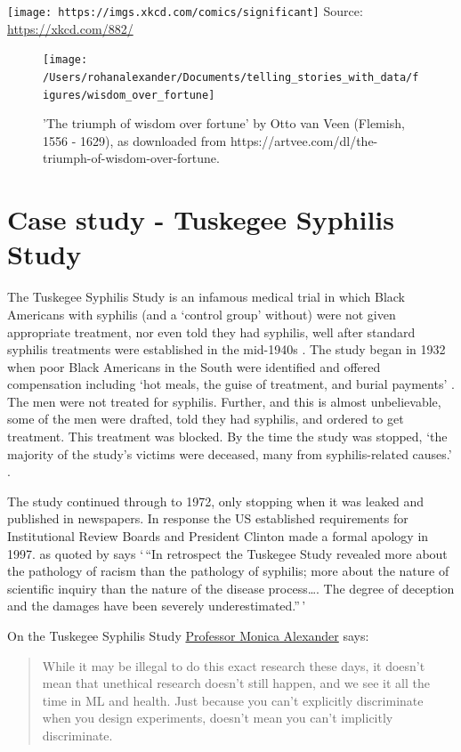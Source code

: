 \documentclass[
]{book}
\begin{document}
\texttt{[image: https://imgs.xkcd.com/comics/significant]}
Source: \url{https://xkcd.com/882/}

\begin{figure}
\texttt{[image: /Users/rohanalexander/Documents/telling\_stories\_with\_data/figures/wisdom\_over\_fortune]} \caption{'The triumph of wisdom over fortune' by Otto van Veen (Flemish, 1556 - 1629), as downloaded from https://artvee.com/dl/the-triumph-of-wisdom-over-fortune.}\label{fig:unnamed-chunk-241}
\end{figure}

\hypertarget{case-study---tuskegee-syphilis-study}{%
\section{Case study - Tuskegee Syphilis Study}\label{case-study---tuskegee-syphilis-study}}

The Tuskegee Syphilis Study is an infamous medical trial in which Black Americans with syphilis (and a `control group' without) were not given appropriate treatment, nor even told they had syphilis, well after standard syphilis treatments were established in the mid-1940s \citep{marcella}. The study began in 1932 when poor Black Americans in the South were identified and offered compensation including `hot meals, the guise of treatment, and burial payments' \citep{marcella}. The men were not treated for syphilis. Further, and this is almost unbelievable, some of the men were drafted, told they had syphilis, and ordered to get treatment. This treatment was blocked. By the time the study was stopped, `the majority of the study's victims were deceased, many from syphilis-related causes.' \citep{marcella}.

The study continued through to 1972, only stopping when it was leaked and published in newspapers. In response the US established requirements for Institutional Review Boards and President Clinton made a formal apology in 1997. \citet{brandt1978racism} as quoted by \citet{marcella} says `\,``In retrospect the Tuskegee Study revealed more about the pathology of racism than the pathology of syphilis; more about the nature of scientific inquiry than the nature of the disease process\ldots. The degree of deception and the damages have been severely underestimated.''\,'

On the Tuskegee Syphilis Study \href{https://www.monicaalexander.com}{Professor Monica Alexander} says:

\begin{quote}
While it may be illegal to do this exact research these days, it doesn't mean that unethical research doesn't still happen, and we see it all the time in ML and health. Just because you can't explicitly discriminate when you design experiments, doesn't mean you can't implicitly discriminate.
\end{quote}
\end{document}
